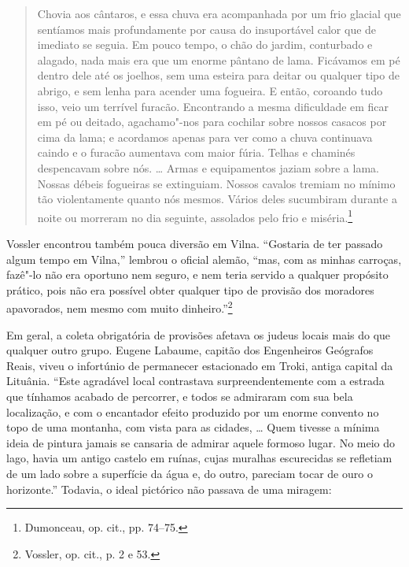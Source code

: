 \begin{quote}
Chovia aos cântaros, e essa chuva era acompanhada por um frio glacial
que sentíamos mais profundamente por causa do insuportável calor que de
imediato se seguia. Em pouco tempo, o chão do jardim, conturbado e
alagado, nada mais era que um enorme pântano de lama. Ficávamos em pé
dentro dele até os joelhos, sem uma esteira para deitar ou qualquer tipo
de abrigo, e sem lenha para acender uma fogueira. E então, coroando tudo
isso, veio um terrível furacão. Encontrando a mesma dificuldade em ficar
em pé ou deitado, agachamo"-nos para cochilar sobre nossos casacos por
cima da lama; e acordamos apenas para ver como a chuva continuava caindo
e o furacão aumentava com maior fúria. Telhas e chaminés despencavam
sobre nós. \ldots{} Armas e equipamentos jaziam sobre a lama. Nossas
débeis fogueiras se extinguiam. Nossos cavalos tremiam no mínimo tão
violentamente quanto nós mesmos. Vários deles sucumbiram durante a noite
ou morreram no dia seguinte, assolados pelo frio e miséria.\footnote{Dumonceau, op. cit., pp. 74--75.} 
\end{quote}

Vossler encontrou também pouca diversão em Vilna. ``Gostaria de ter
passado algum tempo em Vilna,'' lembrou o oficial alemão, ``mas, com as
minhas carroças, fazê"-lo não era oportuno nem seguro, e nem teria
servido a qualquer propósito prático, pois não era possível obter
qualquer tipo de provisão dos moradores apavorados, nem mesmo com muito
dinheiro.''\footnote{Vossler, op. cit., p. 2 e 53.}

Em geral, a coleta obrigatória de provisões afetava os judeus locais
mais do que qualquer outro grupo. Eugene Labaume, capitão dos
Engenheiros Geógrafos Reais, viveu o infortúnio de permanecer
estacionado em Troki, antiga capital da Lituânia. ``Este agradável local
contrastava surpreendentemente com a estrada que tínhamos acabado de
percorrer, e todos se admiraram com sua bela localização, e com o
encantador efeito produzido por um enorme convento no topo de uma
montanha, com vista para as cidades, \ldots{} Quem tivesse a mínima
ideia de pintura jamais se cansaria de admirar aquele formoso lugar. No
meio do lago, havia um antigo castelo em ruínas, cujas muralhas
escurecidas se refletiam de um lado sobre a superfície da água e, do
outro, pareciam tocar de ouro o horizonte.'' Todavia, o ideal pictórico
não passava de uma miragem:

